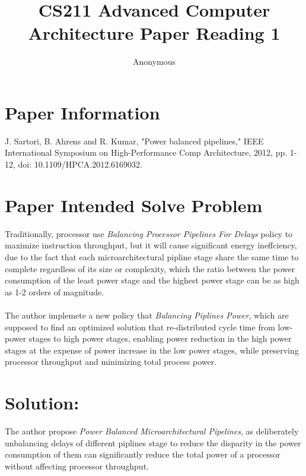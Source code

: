 \documentclass[10pt,a4paper]{article}
\begin{document}
\title{CS211 Advanced Computer Architecture Paper Reading 1}
\author{Anonymous}
\date{}
\maketitle



\section{Paper Information}
J. Sartori, B. Ahrens and R. Kumar, "Power balanced pipelines," IEEE International Symposium on High-Performance Comp Architecture, 2012, pp. 1-12, doi: 10.1109/HPCA.2012.6169032.
\section{Paper Intended Solve Problem}
Traditionally, processor use \emph{Balancing Processor Pipelines For Delays} policy to maximize instruction throughput, but it will cause significant energy ineffciency, due to the fact that each microarchitectural pipline stage share the same time to complete regardless of its size or complexity, which the ratio between the power consumption of the least power stage and the highest power stage can be as high as 1-2 orders of magnitude.\\\\
The author implemete a new policy that \emph{Balancing Piplines Power}, which are supposed to find an optimized solution that re-distributed cycle time from low-power stages to high power stages, enabling power reduction in the high power stages at the expense of power increase in the low power stages, while preserving processor throughput and minimizing total process power.
\section{Solution:}
The author propose \emph{Power Balanced Microarchitectural Pipelines}, as deliberately unbalancing delays of different piplines stage to reduce the disparity in the power consumption of them can significantly reduce the total power of a processor without affecting processor throughput.
\end{document}
